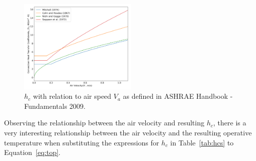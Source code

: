     \begin{figure}[h!]
            \centering
            \includegraphics[width=0.5\textwidth]{figures/hcs4.png}
            \caption{$h_c$ with relation to air speed $V_a$ as defined in ASHRAE Handbook - Fundamentals 2009.}
            \label{fig:hc4s}
    \end{figure}
    Observing the relationship between the air velocity and resulting $h_c$, there is a very interesting relationship between the air velocity and the resulting operative temperature when substituting the expressions for $h_c$ in Table~\ref{tab:hcs} to Equation~\ref{eq:top}. 
